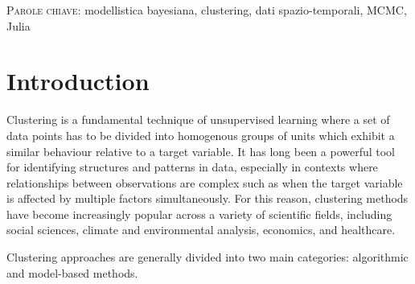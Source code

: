 \documentclass[12pt,	%
	a4paper,		%
	twoside,		%
	openright,		%
	titlepage,%
	]{book}
\theoremstyle{definition}
\begin{document}
\textsc{Parole chiave:} modellistica bayesiana, clustering, dati spazio-temporali, MCMC, Julia


\cleardoublepage

    \tableofcontents


\listoffigures

\listoftables





\cleardoublepage
\mainmatter
% 
% 
% 
% 
% 

\chapter*{Introduction}

Clustering is a fundamental technique of unsupervised learning where a set of data points has to be divided into homogenous groups of units which exhibit a similar behaviour relative to a target variable. It has long been a powerful tool for identifying structures and patterns in data, especially in contexts where relationships between observations are complex such as when the target variable is affected by multiple factors simultaneously. For this reason, clustering methods have become increasingly popular across a variety of scientific fields, including social sciences, climate and environmental analysis, economics, and healthcare. 

Clustering approaches are generally divided into two main categories: algorithmic and model-based methods. 
\end{document}
